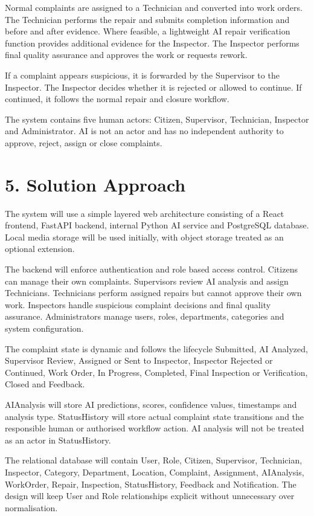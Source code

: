 \documentclass[12pt,a4paper]{article}
\begin{document}
Normal complaints are assigned to a Technician and converted into work orders. The Technician performs the repair and submits completion information and before and after evidence. Where feasible, a lightweight AI repair verification function provides additional evidence for the Inspector. The Inspector performs final quality assurance and approves the work or requests rework.

If a complaint appears suspicious, it is forwarded by the Supervisor to the Inspector. The Inspector decides whether it is rejected or allowed to continue. If continued, it follows the normal repair and closure workflow.

The system contains five human actors: Citizen, Supervisor, Technician, Inspector and Administrator. AI is not an actor and has no independent authority to approve, reject, assign or close complaints.

\section{5. Solution Approach}
The system will use a simple layered web architecture consisting of a React frontend, FastAPI backend, internal Python AI service and PostgreSQL database. Local media storage will be used initially, with object storage treated as an optional extension.

The backend will enforce authentication and role based access control. Citizens can manage their own complaints. Supervisors review AI analysis and assign Technicians. Technicians perform assigned repairs but cannot approve their own work. Inspectors handle suspicious complaint decisions and final quality assurance. Administrators manage users, roles, departments, categories and system configuration.

The complaint state is dynamic and follows the lifecycle Submitted, AI Analyzed, Supervisor Review, Assigned or Sent to Inspector, Inspector Rejected or Continued, Work Order, In Progress, Completed, Final Inspection or Verification, Closed and Feedback.

AIAnalysis will store AI predictions, scores, confidence values, timestamps and analysis type. StatusHistory will store actual complaint state transitions and the responsible human or authorised workflow action. AI analysis will not be treated as an actor in StatusHistory.

The relational database will contain User, Role, Citizen, Supervisor, Technician, Inspector, Category, Department, Location, Complaint, Assignment, AIAnalysis, WorkOrder, Repair, Inspection, StatusHistory, Feedback and Notification. The design will keep User and Role relationships explicit without unnecessary over normalisation.
\end{document}

